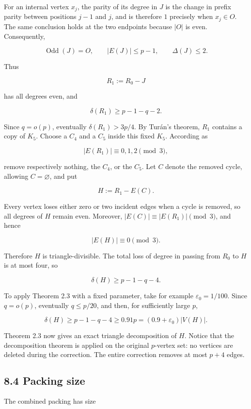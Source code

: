 \documentclass[
  11pt,
]{article}
\begin{document}
For an internal vertex \(x_j\), the parity of its degree in \(J\) is the change in prefix parity between positions \(j-1\) and \(j\), and is therefore \(1\) precisely when \(x_j\in O\). The same conclusion holds at the two endpoints because \(|O|\) is even. Consequently,

\[
\operatorname{Odd}(J)=O,
\qquad
|E(J)|\le p-1,
\qquad
\Delta(J)\le2.
\tag{8.6}
\]

Thus

\[
R_1:=R_0-J
\]

has all degrees even, and

\[
\delta(R_1)\ge p-1-q-2.
\tag{8.7}
\]

Since \(q=o(p)\), eventually \(\delta(R_1)>3p/4\). By Turán's theorem, \(R_1\) contains a copy of \(K_5\). Choose a \(C_4\) and a \(C_5\) inside this fixed \(K_5\). According as

\[
|E(R_1)|\equiv0,1,2\pmod3,
\]

remove respectively nothing, the \(C_4\), or the \(C_5\). Let \(C\) denote the removed cycle, allowing \(C=\varnothing\), and put

\[
H:=R_1-E(C).
\]

Every vertex loses either zero or two incident edges when a cycle is removed, so all degrees of \(H\) remain even. Moreover, \(|E(C)|\equiv |E(R_1)|\pmod3\), and hence

\[
|E(H)|\equiv0\pmod3.
\]

Therefore \(H\) is triangle-divisible. The total loss of degree in passing from \(R_0\) to \(H\) is at most four, so

\[
\delta(H)\ge p-1-q-4.
\tag{8.8}
\]

To apply Theorem 2.3 with a fixed parameter, take for example \(\varepsilon_0=1/100\). Since \(q=o(p)\), eventually \(q\le p/20\), and then, for sufficiently large \(p\),

\[
\delta(H)\ge p-1-q-4\ge0.91p=(0.9+\varepsilon_0)|V(H)|.
\tag{8.9}
\]

Theorem 2.3 now gives an exact triangle decomposition of \(H\). Notice that the decomposition theorem is applied on the original \(p\)-vertex set: no vertices are deleted during the correction. The entire correction removes at most \(p+4\) edges.

\subsection{8.4 Packing size}\label{packing-size}

The combined packing has size
\end{document}
